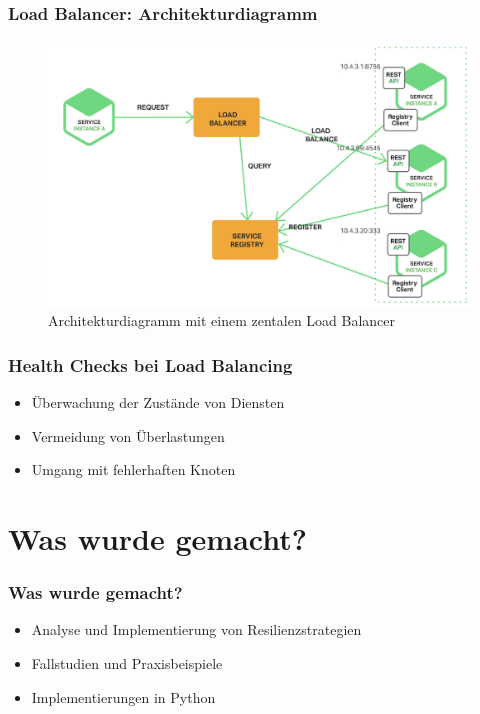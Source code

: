 \begin{frame}
    \frametitle{Load Balancer: Architekturdiagramm}
    \begin{figure}[h]
        \centering
        \includegraphics[height=0.5\textheight]{images/loadbalancer}
        \caption{Architekturdiagramm mit einem zentalen Load Balancer}
    \end{figure}
\end{frame}


\begin{frame}
    \frametitle{Health Checks bei Load Balancing}
    \begin{itemize}
        \item Überwachung der Zustände von Diensten
        \item Vermeidung von Überlastungen
        \item Umgang mit fehlerhaften Knoten
    \end{itemize}
\end{frame}

\section{Was wurde gemacht?}

\begin{frame}
    \frametitle{Was wurde gemacht?}
    \begin{itemize}
        \item Analyse und Implementierung von Resilienzstrategien
        \item Fallstudien und Praxisbeispiele
        \item Implementierungen in Python
    \end{itemize}
\end{frame}

